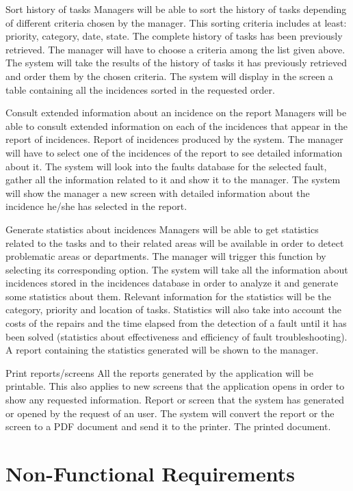 \begin{requirement}{Sort history of tasks}
\reqdesc Managers will be able to sort the history of tasks depending of different criteria chosen by the manager. This sorting criteria includes at least: priority, category, date, state.
\reqin The complete history of tasks has been previously retrieved. The manager will have to choose a criteria among the list given above.
\reqsteps The system will take the results of the history of tasks it has previously retrieved and order them by the chosen criteria.
\reqout The system will display in the screen a table containing all the incidences sorted in the requested order.
\end{requirement}

\begin{requirement}{Consult extended information about an incidence on the report}
\reqdesc Managers will be able to consult extended information on each of the incidences that appear in the report of incidences.
\reqin Report of incidences produced by the system. The manager will have to select one of the incidences of the report to see detailed information about it.
\reqsteps The system will look into the faults database for the selected fault, gather all the information related to it and show it to the manager.
\reqout The system will show the manager a new screen with detailed information about the incidence he/she has selected in the report.
\end{requirement}

\begin{requirement}{Generate statistics about incidences}
\reqdesc Managers will be able to get statistics related to the tasks and to their related areas will be available in order to
detect problematic areas or departments.
\reqin The manager will trigger this function by selecting its corresponding option.
\reqsteps The system will take all the information about incidences stored in the incidences database in order to analyze it and generate some statistics about them. Relevant information for the statistics will be the category, priority and location of tasks. Statistics will also take into account the costs of the repairs and the time elapsed from the detection of a fault until it has been solved (statistics about effectiveness and efficiency of fault troubleshooting).
\reqout A report containing the statistics generated will be shown to the manager.
\end{requirement}

\begin{requirement}{Print reports/screens}
\reqdesc All the reports generated by the application will be printable. This also applies to new screens that the application opens in order to show any requested information.
\reqin Report or screen that the system has generated or opened by the request of an user.
\reqsteps The system will convert the report or the screen to a PDF document and send it to the printer.
\reqout The printed document.
\end{requirement}


\section{Non-Functional Requirements}

